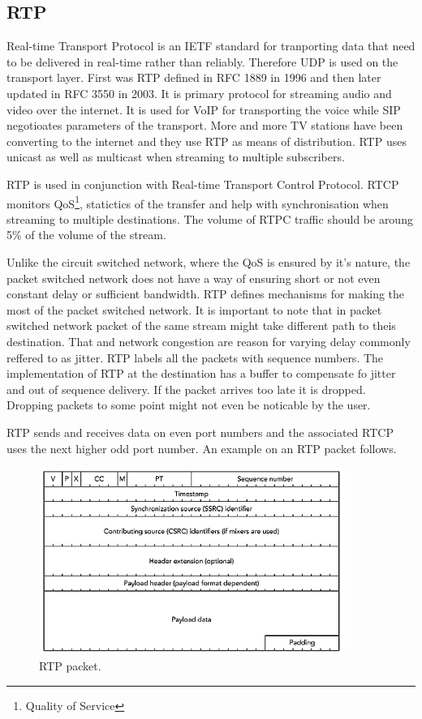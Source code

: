\subsection*{RTP}
Real-time Transport Protocol is an IETF standard for tranporting data that need to be delivered in real-time rather than reliably. Therefore UDP is used on the transport layer. First was RTP defined in RFC 1889 in 1996 and then later updated in RFC 3550 in 2003. It is primary protocol for streaming audio and video over the internet. It is used for VoIP for transporting the voice while SIP negotioates parameters of the transport. More and more TV stations have been converting to the internet and they use RTP as means of distribution. RTP uses unicast as well as multicast when streaming to multiple subscribers.

RTP is used in conjunction with Real-time Transport Control Protocol. RTCP monitors QoS\footnote{Quality of Service}, statictics of the transfer and help with synchronisation when streaming to multiple destinations. The volume of RTPC traffic should be aroung 5\% of the volume of the stream.  

Unlike the circuit switched network, where the QoS is ensured by it's nature, the packet switched network does not have a way of ensuring short or not even constant delay or sufficient bandwidth. RTP defines mechanisms for making the most of the packet switched network. It is important to note that in packet switched network packet of the same stream might take different path to theis destination. That and network congestion are reason for varying delay commonly reffered to as jitter. RTP labels all the packets with sequence numbers. The implementation of RTP at the destination has a buffer to compensate fo jitter and out of sequence delivery. If the packet arrives too late it is dropped. Dropping packets to some point might not even be noticable by the user. 

RTP sends and receives data on even port numbers and the associated RTCP uses the next higher odd port number. An example on an RTP packet follows. 

\begin{figure}[ht]
	\begin{center}
	\includegraphics[width=10cm]{fig/rtp-packet.png}
	\caption{RTP packet.\cite{rtpBook}}
	\label{fig:rtpPacket}
\end{center}
\end{figure}

